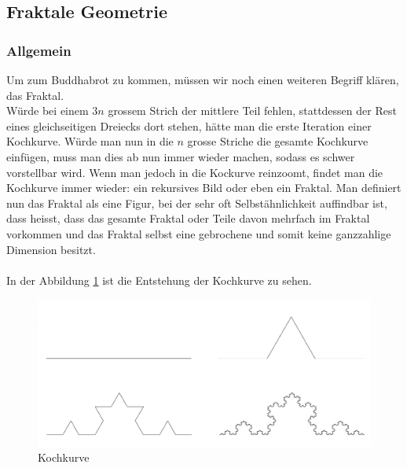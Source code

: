 \subsection{Fraktale Geometrie}
\subsubsection{Allgemein}
Um zum Buddhabrot zu kommen, müssen wir noch einen weiteren Begriff klären, das Fraktal.\\ Würde bei einem 3$n$ grossem Strich der mittlere Teil fehlen, stattdessen der Rest eines gleichseitigen Dreiecks dort stehen, hätte man die erste Iteration einer Kochkurve. Würde man nun in die $n$ grosse Striche die gesamte Kochkurve einfügen, muss man dies ab nun immer wieder machen, sodass es schwer vorstellbar wird. Wenn man jedoch in die Kockurve reinzoomt, findet man die Kochkurve immer wieder: ein rekursives Bild oder eben ein Fraktal. Man definiert nun das Fraktal als eine Figur, bei der sehr oft Selbstähnlichkeit auffindbar ist, dass heisst, dass das gesamte Fraktal oder Teile davon mehrfach im Fraktal vorkommen und das Fraktal selbst eine gebrochene und somit keine ganzzahlige Dimension besitzt.\\
\\
In der Abbildung \ref{fig:Kochkurve} ist die Entstehung der Kochkurve zu sehen.

\begin{figure}[h]
    \centering
    \includegraphics[width=.5\textwidth]{Pictures/Kochkurve.png}
    \caption{Kochkurve}
    \label{fig:Kochkurve}
\end{figure}

